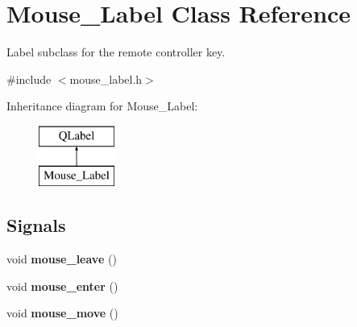 \hypertarget{class_mouse___label}{}\section{Mouse\+\_\+\+Label Class Reference}
\label{class_mouse___label}


Label subclass for the remote controller key.  




{\ttfamily \#include $<$mouse\+\_\+label.\+h$>$}

Inheritance diagram for Mouse\+\_\+\+Label\+:\begin{figure}[H]
\begin{center}
\leavevmode
\includegraphics[height=2.000000cm]{class_mouse___label}
\end{center}
\end{figure}
\subsection*{Signals}
\begin{DoxyCompactItemize}
\item 
\hypertarget{class_mouse___label_a69e2c41ee8844e70e024b83749fd5818}{}void {\bfseries mouse\+\_\+leave} ()\label{class_mouse___label_a69e2c41ee8844e70e024b83749fd5818}

\item 
\hypertarget{class_mouse___label_a056e4e3bf3951743f674ba62d939a57f}{}void {\bfseries mouse\+\_\+enter} ()\label{class_mouse___label_a056e4e3bf3951743f674ba62d939a57f}

\item 
\hypertarget{class_mouse___label_af8de33fa7362e3d7b26b67dc2b57b717}{}void {\bfseries mouse\+\_\+move} ()\label{class_mouse___label_af8de33fa7362e3d7b26b67dc2b57b717}

\end{DoxyCompactItemize}
